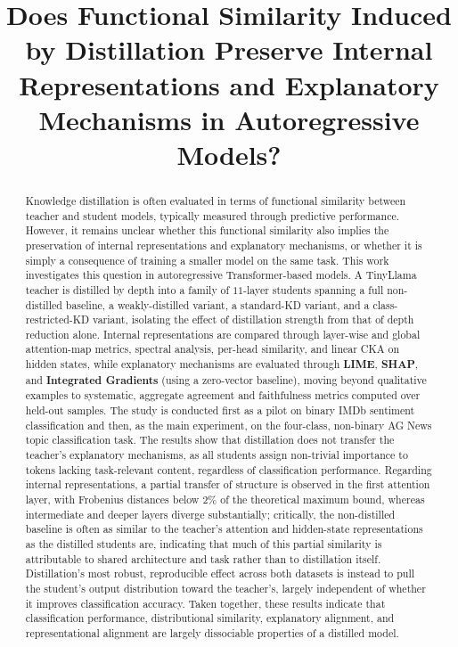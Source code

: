 \documentclass[conference]{IEEEtran}
\title{Does Functional Similarity Induced by Distillation Preserve Internal Representations and Explanatory Mechanisms in Autoregressive Models?}
\author{
\IEEEauthorblockN{Martín Perciante}
\IEEEauthorblockA{Universidad Católica del Uruguay\\ Montevideo, Uruguay\\\href{mailto:tincho.perciante@gmail.com
}{tincho.perciante@gmail.com}}}
\begin{document}
\maketitle

\begin{abstract}
Knowledge distillation is often evaluated in terms of functional similarity between teacher and student models, typically measured through predictive performance. However, it remains unclear whether this functional similarity also implies the preservation of internal representations and explanatory mechanisms, or whether it is simply a consequence of training a smaller model on the same task. This work investigates this question in autoregressive Transformer-based models. A TinyLlama teacher is distilled by depth into a family of $11$-layer students spanning a full non-distilled baseline, a weakly-distilled variant, a standard-KD variant, and a class-restricted-KD variant, isolating the effect of distillation strength from that of depth reduction alone. Internal representations are compared through layer-wise and global attention-map metrics, spectral analysis, per-head similarity, and linear CKA on hidden states, while explanatory mechanisms are evaluated through \textbf{LIME}, \textbf{SHAP}, and \textbf{Integrated Gradients} (using a zero-vector baseline), moving beyond qualitative examples to systematic, aggregate agreement and faithfulness metrics computed over held-out samples. The study is conducted first as a pilot on binary IMDb sentiment classification and then, as the main experiment, on the four-class, non-binary AG News topic classification task. The results show that distillation does not transfer the teacher's explanatory mechanisms, as all students assign non-trivial importance to tokens lacking task-relevant content, regardless of classification performance. Regarding internal representations, a partial transfer of structure is observed in the first attention layer, with Frobenius distances below $2\%$ of the theoretical maximum bound, whereas intermediate and deeper layers diverge substantially; critically, the non-distilled baseline is often as similar to the teacher's attention and hidden-state representations as the distilled students are, indicating that much of this partial similarity is attributable to shared architecture and task rather than to distillation itself. Distillation's most robust, reproducible effect across both datasets is instead to pull the student's output distribution toward the teacher's, largely independent of whether it improves classification accuracy. Taken together, these results indicate that classification performance, distributional similarity, explanatory alignment, and representational alignment are largely dissociable properties of a distilled model.
\end{abstract}
\end{document}
